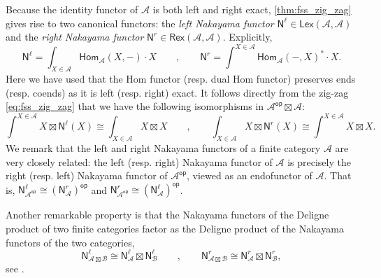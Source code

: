 \documentclass[11pt]{article}
\newcommand{\N}{\mathbb{N}}
\newcommand{\Hom}{\mathrm{Hom}}
\newcommand{\cA}{\mathcal{A}}
\theoremstyle{definition}
\begin{document}
Because the identity functor of $\mathcal{A}$ is both left and right exact, \cref{thm:fss_zig_zag} gives rise to two canonical functors: the \emph{left Nakayama functor} $\mathsf{N}^\ell \in \mathsf{Lex}(\mathcal{A}, \mathcal{A})$ and the \emph{right Nakayama functor} $\mathsf{N}^r \in \mathsf{Rex}(\mathcal{A}, \mathcal{A})$. Explicitly,
\begin{equation}\label{eq:Nakayama_functors}
\mathsf{N}^\ell= \int_{X\in \mathcal{A}} \mathsf{Hom}_\mathcal{A} (X,-) \cdot X \qquad , \qquad \mathsf{N}^r= \int^{X\in \mathcal{A}} \mathsf{Hom}_\mathcal{A} (-,X)^* \cdot X  .
\end{equation}
Here we have used that the Hom functor (resp. dual Hom functor) preserves ends (resp. coends) as it is left (resp. right) exact. It follows directly from the zig-zag \eqref{eq:fss_zig_zag} that we have the following isomorphisms in $\mathcal{A}^\mathsf{op} \boxtimes \mathcal{A}$:
\begin{equation}
\int^{X \in \mathcal{A}} X \boxtimes \mathsf{N}^\ell(X) \cong \int_{X \in \mathcal{A}}  X \boxtimes X \qquad ,  \qquad  \int_{X \in \mathcal{A}} X \boxtimes \mathsf{N}^r(X) \cong \int^{X \in \mathcal{A}}  X \boxtimes X.
\end{equation}
We remark that the left and right Nakayama functors of a finite category $\mathcal{A}$ are very closely related: the left (resp. right) Nakayama functor of $\mathcal{A}$ is precisely the right (resp. left) Nakayama functor of $\mathcal{A}^\mathsf{op}$, viewed as an endofunctor of $\mathcal{A}$. That is, $\mathsf{N}^\ell_{\mathcal{A}^\mathsf{op}}\cong (\mathsf{N}^r_{\mathcal{A}})^\mathsf{op}$ and $\mathsf{N}^r_{\mathcal{A}^\mathsf{op}}\cong (\mathsf{N}^\ell_{\mathcal{A}})^\mathsf{op}$.


Another remarkable property is that the Nakayama functors of the Deligne product of two finite categories factor as the Deligne product of the Nakayama functors of the two categories,
\begin{equation}
\mathsf{N}^\ell_{\mathcal{A} \boxtimes \mathcal{B}} \cong \mathsf{N}^\ell_{\mathcal{A} } \boxtimes \mathsf{N}^\ell_{\mathcal{B}} \qquad , \qquad  \mathsf{N}^r_{\mathcal{A} \boxtimes \mathcal{B}} \cong \mathsf{N}^r_{\mathcal{A} } \boxtimes \mathsf{N}^r_{\mathcal{B}},
\end{equation}
see \cite[Proposition 3.20]{fss}.

\end{document}
